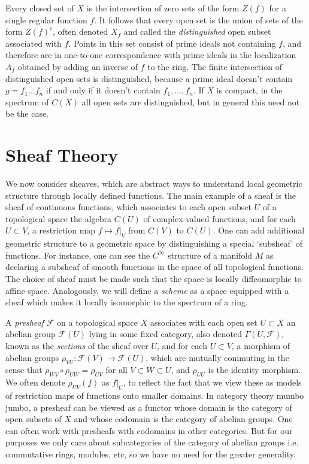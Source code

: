 Every closed set of $X$ is the intersection of zero sets of the form $Z(f)$ for a single regular function $f$. It follows that every open set is the union of sets of the form $Z(f)^c$, often denoted $X_f$ and called the \emph{distinguished} open subset associated with $f$. Points in this set consist of prime ideals not containing $f$, and therefore are in one-to-one correspondence with prime ideals in the localization $A_f$ obtained by adding an inverse of $f$ to the ring. The finite intersection of distinguished open sets is distinguished, because a prime ideal doesn't contain $g = f_1 \dots f_n$ if and only if it doesn't contain $f_1, \dots, f_n$. If $X$ is compact, in the spectrum of $C(X)$ all open sets are distinguished, but in general this need not be the case.

\section{Sheaf Theory}

We now consider sheaves, which are abstract ways to understand local geometric structure through locally defined functions. The main example of a sheaf is the sheaf of continuous functions, which associates to each open subset $U$ of a topological space the algebra $C(U)$ of complex-valued functions, and for each $U \subset V$, a restriction map $f \mapsto f|_V$ from $C(V)$ to $C(U)$. One can add additional geometric structure to a geometric space by distinguishing a special `subsheaf' of functions. For instance, one can see the $C^\infty$ structure of a manifold $M$ as declaring a subsheaf of smooth functions in the space of all topological functions. The choice of sheaf must be made such that the space is locally diffeomorphic to affine space. Analogously, we will define a {\it scheme} as a space equipped with a sheaf which makes it locally isomorphic to the spectrum of a ring.

A \emph{presheaf} $\mathcal{F}$ on a topological space $X$ associates with each open set $U \subset X$ an abelian group $\mathcal{F}(U)$ lying in some fixed category, also denoted $\Gamma(U,\mathcal{F})$, known as the {\it sections} of the sheaf over $U$, and for each $U \subset V$, a morphism of abelian groups $\rho_{VU}: \mathcal{F}(V) \to \mathcal{F}(U)$, which are mutually commuting in the sense that $\rho_{WV} \circ \rho_{UW} = \rho_{UV}$ for all $V \subset W \subset U$, and $\rho_{UU}$ is the identity morphism. We often denote $\rho_{UV}(f)$ as $f|_U$, to reflect the fact that we view these as models of restriction maps of functions onto smaller domains. In category theory mumbo jumbo, a presheaf can be viewed as a functor whose domain is the category of open subsets of $X$ and whose codomain is the category of abelian groups. One can often work with presheafs with codomains in other categories. But for our purposes we only care about subcategories of the category of abelian groups i.e. commutative rings, modules, etc, so we have no need for the greater generality.

